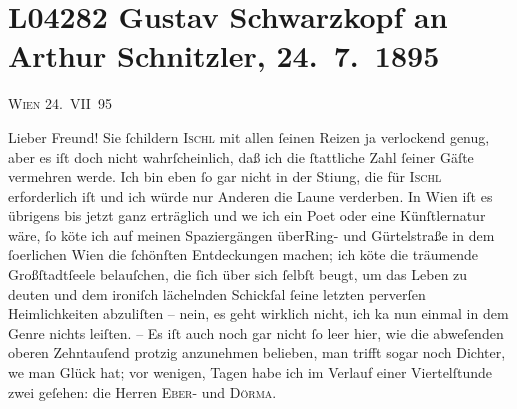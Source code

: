

\section[Gustav Schwarzkopf an Arthur Schnitzler, 24. 7. 1895]{L04282 Gustav Schwarzkopf an Arthur Schnitzler, 24. 7. 1895}
\nopagebreak{}
\rehead{ }\normalsize\beginnumbering{}
\toendnotes[C]{\smallbreak\pagebreak[2]}
\toendnotes[C]{\smallbreak}
\pstart
           \raggedleft{}{\pb}\textsc{Wien}{ }24. VII 95\pend
           
\pstart{}Lieber Freund!\pend\vspace{0.5em}
\pstart
           Sie{ }ſchildern \textsc{Ischl} mit allen{ }ſeinen Reizen ja verlockend genug, aber es iſt doch nicht
               wahrſcheinlich, daß ich die{ }ſtattliche Zahl{ }ſeiner Gäſte vermehren werde. Ich bin
               eben{ }ſo gar nicht in der Sti{\geminationm}ung, die für \textsc{Ischl} erforderlich iſt und ich würde nur Anderen die Laune verderben. In Wien iſt es übrigens bis jetzt ganz erträglich und
                  we{\geminationn} ich ein Poet oder {\pb}eine Künſtlernatur wäre,{ }ſo kö{\geminationn}te ich auf meinen Spaziergängen überRing- und Gürtelstraße in
               dem{ }ſo{\geminationm}erlichen Wien
               die{ }ſchönſten Entdeckungen machen; ich kö{\geminationn}te die
               träumende Großſtadtſeele belauſchen, die{ }ſich über sich{ }ſelbſt beugt, um das Leben zu
               deuten und dem ironiſch lächelnden Schickſal{ }ſeine letzten perverſen Heimlichkeiten
               abzuliſten – nein, es geht wirklich nicht, ich ka{\geminationn} nun
               einmal in dem Genre nichts leiſten. – Es iſt auch noch gar nicht{ }ſo leer hier, wie
               die abweſenden {\pb}oberen Zehntauſend
               protzig anzunehmen belieben, man trifft sogar noch Dichter, we{\geminationn} man Glück hat; vor wenigen, Tagen habe ich im Verlauf
               einer Viertelſtunde zwei geſehen: die Herren \textsc{Eber-} und \textsc{Dörma{\geminationn}}.\pend
           
